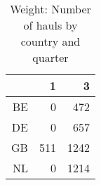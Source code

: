 \begin{table}[ht]
\centering
\begin{tabular}{rrr}
  \hline
 & 1 & 3 \\ 
  \hline
BE & 0 & 472 \\ 
  DE & 0 & 657 \\ 
  GB & 511 & 1242 \\ 
  NL & 0 & 1214 \\ 
   \hline
\end{tabular}
\caption{Weight: Number of hauls by country and quarter} 
\end{table}
